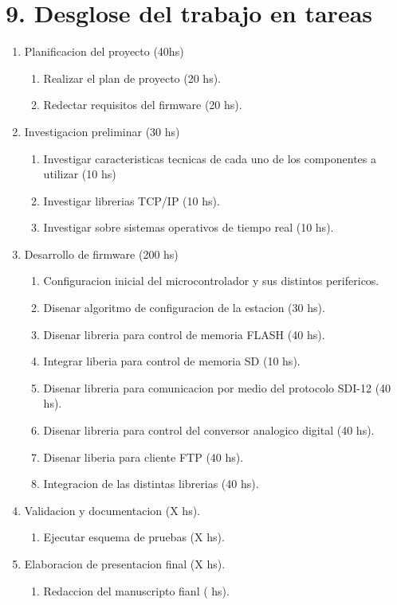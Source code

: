 \documentclass[
11pt, %
codirector, %
]{charter}
\begin{document}
\section{9. Desglose del trabajo en tareas}
\label{sec:wbs}

\begin{enumerate}
\item Planificacion del proyecto (40hs)
	\begin{enumerate}
	\item Realizar el plan de proyecto (20 hs).
	\item Redectar requisitos del firmware (20 hs).
	\end{enumerate}
\item Investigacion preliminar (30 hs)
	\begin{enumerate}
	\item Investigar caracteristicas tecnicas de cada uno de los componentes a utilizar (10 hs)
	\item Investigar librerias TCP/IP (10 hs).
	\item Investigar sobre sistemas operativos de tiempo real (10 hs).
	\end{enumerate}
\item Desarrollo de firmware (200 hs)
	\begin{enumerate}
	\item Configuracion inicial del microcontrolador y sus distintos perifericos. 
	\item Disenar algoritmo de configuracion de la estacion (30 hs).
	\item Disenar libreria para control de memoria FLASH (40 hs).
	\item Integrar liberia para control de memoria SD (10 hs).
	\item Disenar libreria para comunicacion por medio del protocolo SDI-12 (40 hs).
	\item Disenar libreria para control del conversor analogico digital (40 hs).
	\item Disenar liberia para cliente FTP (40 hs).
	\item Integracion de las distintas librerias (40 hs).
	\end{enumerate}
\item Validacion y documentacion (X hs).
	\begin{enumerate}
	\item Ejecutar esquema de pruebas (X hs).
	
	\end{enumerate}
\item Elaboracion de presentacion final (X hs).
	\begin{enumerate}
	\item Redaccion del manuscripto fianl ( hs).
	\end{enumerate}
\end{enumerate}
\end{document}
